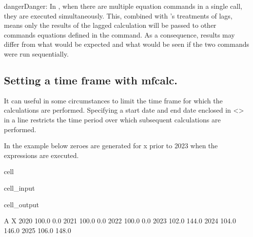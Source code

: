 \documentclass[letterpaper,10pt,english]{jupyterBook}
\begin{document}
\begin{sphinxadmonition}{danger}{Danger:}
\sphinxAtStartPar
In , when there are multiple equation commands in a single call, they are executed simultaneously. This, combined with ’s  treatments of lags, means only the results of the lagged calculation will be passed to other commands equations defined in the  command. As a consequence, results may differ from what would be expected and what would be seen if the two commands were run sequentially.
\end{sphinxadmonition}


\subsection{Setting a time frame with mfcalc.}
\label{\detokenize{content/04_PythonEssentials/mfcalc:setting-a-time-frame-with-mfcalc}}
\sphinxAtStartPar
It can useful in some circumstances to limit the time frame for which the calculations are performed. Specifying a start date and end date enclosed in <> in a line restricts the time period over which subsequent calculations are performed.

\sphinxAtStartPar
In the example below zeroes are generated for x prior to 2023 when the expressions are executed.

\begin{sphinxuseclass}{cell}\begin{sphinxVerbatimInput}

\begin{sphinxuseclass}{cell_input}
\begin{sphinxVerbatim}[commandchars=\\\{\}]
  


\end{sphinxVerbatim}

\end{sphinxuseclass}\end{sphinxVerbatimInput}
\begin{sphinxVerbatimOutput}

\begin{sphinxuseclass}{cell_output}
\begin{sphinxVerbatim}[commandchars=\\\{\}]
          A      X
2020  100.0    0.0
2021  100.0    0.0
2022  100.0    0.0
2023  102.0  144.0
2024  104.0  146.0
2025  106.0  148.0
\end{sphinxVerbatim}

\end{sphinxuseclass}\end{sphinxVerbatimOutput}

\end{sphinxuseclass}
\sphinxstepscope
\end{document}
